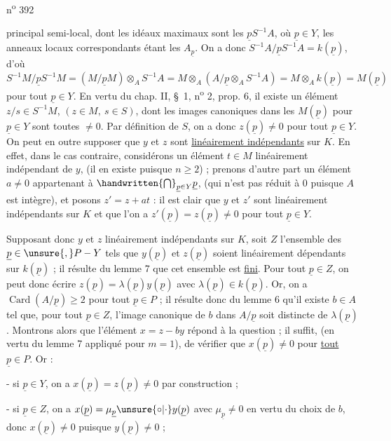 \noindent\hfill n\textsuperscript{o} 392\par

principal semi-local, dont les idéaux maximaux sont les $\underline{p}S^{-1}A$, où $\underline{p}\in Y$, les anneaux locaux correspondants étant les $A_{\underline{p}}$. On a donc $S^{-1}A/\underline{p}S^{-1}A=k(\underline{p})$, d'où $S^{-1}M/\underline{p}S^{-1}M=(M/\underline{p}M)\otimes_A S^{-1}A=M\otimes_A(A/\underline{p}\otimes_A S^{-1}A)=M\otimes_A k(\underline{p})=M(\underline{p})$ pour tout $\underline{p}\in Y$. En vertu du chap. II, \S~1, n\textsuperscript{o} 2, prop. 6, il existe un élément $z/s\in S^{-1}M$, $(z\in M,\ s\in S)$, dont les images canoniques dans les $M(\underline{p})$ pour $\underline{p}\in Y$ sont toutes $\ne 0$. Par définition de $S$, on a donc $z(\underline{p})\ne 0$ pour tout $\underline{p}\in Y$. On peut en outre supposer que $y$ et $z$ sont \uline{linéairement indépendants} sur $K$. En effet, dans le cas contraire, considérons un élément $t\in M$ linéairement indépendant de $y$, (il en existe puisque $n\geq 2$) ; prenons d'autre part un élément $a\ne 0$ appartenant à $\handwritten{\bigcap}_{\underline{p}\in Y}\underline{p}$, (qui n'est pas réduit à 0 puisque $A$ est intègre), et posons $z'=z+at$ : il est clair que $y$ et $z'$ sont linéairement indépendants sur $K$ et que l'on a $z'(\underline{p})=z(\underline{p})\ne 0$ pour tout $\underline{p}\in Y$.

Supposant donc $y$ et $z$ linéairement indépendants sur $K$, soit $Z$ l'ensemble des $\underline{p}\in\unsure{,} P-Y$ tels que $y(\underline{p})$ et $z(\underline{p})$ soient linéairement dépendants sur $k(\underline{p})$ ; il résulte du lemme 7 que cet ensemble est \uline{fini}. Pour tout $\underline{p}\in Z$, on peut donc écrire $z(\underline{p})=\lambda(\underline{p})y(\underline{p})$ avec $\lambda(\underline{p})\in k(\underline{p})$. Or, on a $\operatorname{Card}(A/\underline{p})\geq 2$ pour tout $\underline{p}\in P$ ; il résulte donc du lemme 6 qu'il existe $b\in A$ tel que, pour tout $\underline{p}\in Z$, l'image canonique de $b$ dans $A/\underline{p}$ soit distincte de $\lambda(\underline{p})$. Montrons alors que l'élément $x=z-by$ répond à la question ; il suffit, (en vertu du lemme 7 appliqué pour $m=1$), de vérifier que $x(\underline{p})\ne 0$ pour \uline{tout} $\underline{p}\in P$. Or :

- si $\underline{p}\in Y$, on a $x(\underline{p})=z(\underline{p})\ne 0$ par construction ;

- si $\underline{p}\in Z$,\unsure{\textbackslash} on a $x(\underline{p})=\mu_{\underline{p}}\unsure{\circ|\cdot}y(\underline{p})$ avec $\mu_{\underline{p}}\ne 0$ en vertu du choix de $b$, donc $x(\underline{p})\ne 0$ puisque $y(\underline{p})\ne 0$ ;

